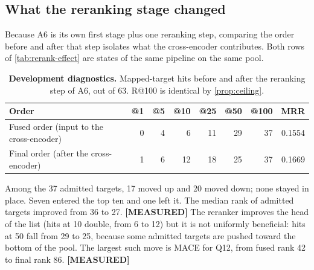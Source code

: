 \documentclass[11pt,a4paper]{article}
\newcommand{\cref}[1]{\autoref{#1}}
\theoremstyle{remark}
\newcommand{\vtag}[2]{{\sffamily\scriptsize\bfseries\textcolor{#1}{[#2]}}}
\newcommand{\Mtag}{\vtag{measgreen}{MEASURED}}
\begin{document}
\subsection{What the reranking stage changed}

Because A6 is its own first stage plus one reranking step, comparing the order before and
after that step isolates what the cross-encoder contributes. Both rows of
\cref{tab:rerank-effect} are states of the same pipeline on the same pool.

\begin{table}[H]
\centering
\caption[Effect of the reranking step (development diagnostics)]{\textbf{Development diagnostics.} Mapped-target hits before and after the
reranking step of A6, out of 63. R@100 is identical by \cref{prop:ceiling}.}
\label{tab:rerank-effect}
\small
\begin{tabular}{lrrrrrrr}
\toprule
Order & @1 & @5 & @10 & @25 & @50 & @100 & MRR\\
\midrule
Fused order (input to the cross-encoder) & 0 & 4 & 6 & 11 & 29 & 37 & 0.1554\\
Final order (after the cross-encoder) & 1 & 6 & 12 & 18 & 25 & 37 & 0.1669\\
\bottomrule
\end{tabular}
\end{table}

Among the 37 admitted targets, 17 moved up and 20 moved down; none stayed in place. Seven
entered the top ten and one left it. The median rank of admitted targets improved from 36
to 27. \Mtag{} The reranker improves the head of the list (hits at 10 double, from 6 to
12) but it is not uniformly beneficial: hits at 50 fall from 29 to 25, because some
admitted targets are pushed toward the bottom of the pool. The largest such move is MACE
for Q12, from fused rank 42 to final rank 86. \Mtag
\end{document}
